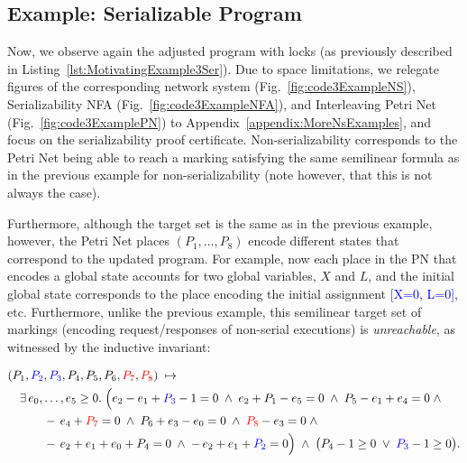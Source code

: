 
\subsection{Example: Serializable Program}
\label{subsec:ns-serializable}

Now, we observe again the adjusted program with locks (as previously described in Listing~\ref{lst:MotivatingExample3Ser}).
%
Due to space limitations, we relegate figures of the corresponding network system (Fig.~\ref{fig:code3ExampleNS}), Serializability NFA (Fig.~\ref{fig:code3ExampleNFA}), and Interleaving Petri Net (Fig.~\ref{fig:code3ExamplePN}) to Appendix~\ref{appendix:MoreNsExamples}, and focus on the serializability proof certificate.
%
Non-serializability corresponds to the Petri Net being able to reach a marking satisfying the same semilinear formula as in the previous example for non-serializability (note however, that this is not always the case). 
%


Furthermore, although the target set is the same as in the previous example, however, the Petri Net places $(P_1,\ldots,P_8)$ encode different states that correspond to the updated program. For example, now each place in the PN that encodes a global state accounts for two global variables, $X$ and $L$, and the initial global state corresponds to the place encoding the initial assignment \textcolor{blue}{[X=0, L=0]}, etc.
%
Furthermore, unlike the previous example, this semilinear target set of markings (encoding request/responses of non-serial executions) is \textit{unreachable}, as witnessed by the inductive invariant:


\[
\begin{aligned}
	&(P_{1},\textcolor{blue}{P_{2}},\textcolor{blue}{P_{3}},P_{4},P_{5},P_{6},\textcolor{red}{P_{7}},\textcolor{red}{P_{8}})
	\;\mapsto\;\\
	&\quad
	\exists\,e_{0},\dots,e_{5}\ge0.\;
	\Bigl(
	e_{2}-e_{1}+\textcolor{blue}{P_{3}}-1=0\;\land\;
	e_{2}+P_{1}-e_{5}=0\;\land\;
	P_{5}-e_{1}+e_{4}=0\;\land\\
	&\qquad\quad
	-\,e_{4}+\textcolor{red}{P_{7}}=0\;\land\;
	P_{6}+e_{3}-e_{0}=0\;\land\;
	\textcolor{red}{P_{8}}-e_{3}=0\;\land\\
	&\qquad\quad
	-\,e_{2}+e_{1}+e_{0}+P_{4}=0\;\land\;
	-\,e_{2}+e_{1}+\textcolor{blue}{P_{2}}=0
	\Bigr)
	\;\land\;
	\bigl(P_{4}-1\ge0\;\lor\;\textcolor{blue}{P_{3}}-1\ge0\bigr).
\end{aligned}
\]


